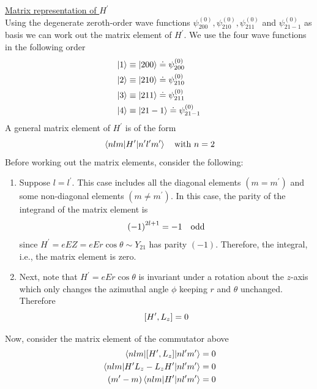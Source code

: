 	\underline{Matrix representation of $H^\prime$}\\
	Using the degenerate zeroth-order wave functions $\psi^{(0)}_{2 0 0},  \psi^{(0)}_{2 1 0}, \psi^{(0)}_{2 1 1}$ and $\psi^{(0)}_{2 1 -1}$  as basis we can work out the matrix element of $H^\prime$. We use the four wave functions in the following order
	\begin{align}
	\begin{aligned}
		\ket{1} &\equiv \ket{200} \doteq \psi_{200}^{(0)} \\
		\ket{2} &\equiv \ket{210} \doteq \psi_{210}^{(0)} \\
		\ket{3} &\equiv \ket{211} \doteq \psi_{211}^{(0)} \\
		\ket{4} &\equiv \ket{21-1} \doteq \psi_{21-1}^{(0)}
	\end{aligned}
		\label{chapter20.ex.degenerate.eqn1}
	\end{align}
	A general matrix element of $H^\prime$ is of the form 
	\begin{equation*}
		\mel{n l m}{H^\prime}{n^\prime l^\prime m^\prime}\quad \text{with}\ n=2
	\end{equation*}
	Before working out the matrix elements, consider the following:
	\begin{enumerate}
		\item 	Suppose $l=l^\prime$. This case includes all the diagonal elements $(m=m^\prime)$ and some non-diagonal elements $(m\neq m^\prime)$. In this case, the parity of the integrand of the matrix element is
		\begin{equation*}
			\qty(-1)^{2l + 1} = -1 \quad \text{odd}
		\end{equation*}
		since $H^\prime = e E Z = e E r \cos\theta \sim Y_{21}$ has parity $(-1)$. Therefore, the integral, i.e., the matrix element is zero.
		
		
		\item Next, note that $H^\prime = e E r\cos\theta$ is invariant under a rotation about the $z$-axis which only changes the azimuthal angle $\phi$ keeping $r$ and $\theta$ unchanged. Therefore
		\begin{equation*}
		\comm{H^\prime}{L_z} = 0
		\end{equation*}
	\end{enumerate}
	Now, consider the matrix element of the commutator above
	\begin{align*}
		\mel{n l m}{\comm{H^\prime}{L_z}}{n l^\prime m^\prime} &= 0 \\
		\mel{n l m}{H^\prime L_z - L_z H^\prime}{n l^\prime m^\prime} &= 0 \\
		\qty(m^\prime - m)\mel{n l m}{H^\prime }{n l^\prime m^\prime} &= 0 
	\end{align*}
